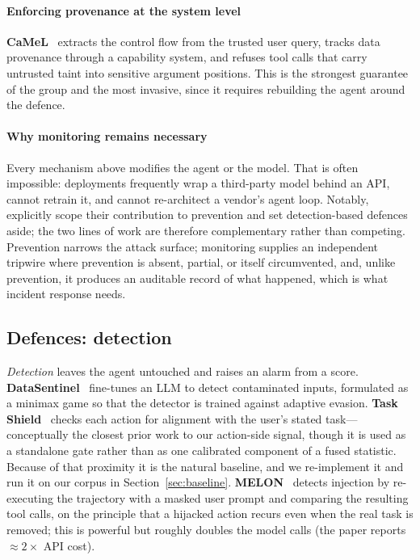 \documentclass[pdflatex,sn-basic]{sn-jnl}%
\theoremstyle{thmstyleone}
\theoremstyle{thmstyletwo}
\theoremstyle{thmstylethree}
\begin{document}
\paragraph{Enforcing provenance at the system level}
\textbf{CaMeL}~\citep{debenedetti2025camel} extracts the control flow from the
trusted user query, tracks data provenance through a capability system, and
refuses tool calls that carry untrusted taint into sensitive argument positions.
This is the strongest guarantee of the group and the most invasive, since it
requires rebuilding the agent around the defence.

\paragraph{Why monitoring remains necessary}
Every mechanism above modifies the agent or the model. That is often impossible:
deployments frequently wrap a third-party model behind an API, cannot retrain it,
and cannot re-architect a vendor's agent loop. Notably, \citet{chen2025secalign}
explicitly scope their contribution to prevention and set detection-based defences
aside; the two lines of work are therefore complementary rather than competing.
Prevention narrows the attack surface; monitoring supplies an independent tripwire
where prevention is absent, partial, or itself circumvented, and, unlike
prevention, it produces an auditable record of what happened, which is what
incident response needs.

\subsection{Defences: detection}

\emph{Detection} leaves the agent untouched and raises an alarm from a score.
\textbf{DataSentinel}~\citep{liu2025datasentinel} fine-tunes an LLM to detect
contaminated inputs, formulated as a minimax game so that the detector is trained
against adaptive evasion. \textbf{Task Shield}~\citep{jia2024taskshield} checks
each action for alignment with the user's stated task---conceptually the closest
prior work to our action-side signal, though it is used as a standalone gate
rather than as one calibrated component of a fused statistic. Because of that
proximity it is the natural baseline, and we re-implement it and run it on our
corpus in Section~\ref{sec:baseline}.
\textbf{MELON}~\citep{zhu2025melon} detects injection by re-executing the
trajectory with a masked user prompt and comparing the resulting tool calls, on
the principle that a hijacked action recurs even when the real task is removed;
this is powerful but roughly doubles the model calls (the paper reports
$\approx 2\times$ API cost).
\end{document}
